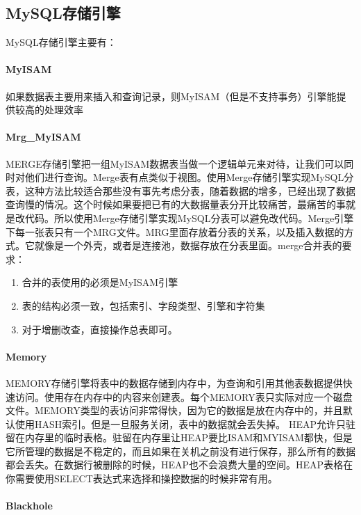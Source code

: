 \documentclass[../../../interview-questions.tex]{subfiles}
\begin{document}
\subsection{MySQL存储引擎}

MySQL存储引擎主要有： \paragraph{MyISAM} 

如果数据表主要用来插入和查询记录，则MyISAM（但是不支持事务）引擎能提供较高的处理效率

\paragraph{Mrg\_MyISAM} 

MERGE存储引擎把一组MyISAM数据表当做一个逻辑单元来对待，让我们可以同时对他们进行查询。Merge表有点类似于视图。使用Merge存储引擎实现MySQL分表，这种方法比较适合那些没有事先考虑分表，随着数据的增多，已经出现了数据查询慢的情况。这个时候如果要把已有的大数据量表分开比较痛苦，最痛苦的事就是改代码。所以使用Merge存储引擎实现MySQL分表可以避免改代码。Merge引擎下每一张表只有一个MRG文件。MRG里面存放着分表的关系，以及插入数据的方式。它就像是一个外壳，或者是连接池，数据存放在分表里面。merge合并表的要求：

\begin{enumerate}
\item{合并的表使用的必须是MyISAM引擎}
\item{表的结构必须一致，包括索引、字段类型、引擎和字符集}
\item{对于增删改查，直接操作总表即可。}
\end{enumerate}


\paragraph{Memory}

MEMORY存储引擎将表中的数据存储到内存中，为查询和引用其他表数据提供快速访问。使用存在内存中的内容来创建表。每个MEMORY表只实际对应一个磁盘文件。MEMORY类型的表访问非常得快，因为它的数据是放在内存中的，并且默认使用HASH索引。但是一旦服务关闭，表中的数据就会丢失掉。 HEAP允许只驻留在内存里的临时表格。驻留在内存里让HEAP要比ISAM和MYISAM都快，但是它所管理的数据是不稳定的，而且如果在关机之前没有进行保存，那么所有的数据都会丢失。在数据行被删除的时候，HEAP也不会浪费大量的空间。HEAP表格在你需要使用SELECT表达式来选择和操控数据的时候非常有用。


\paragraph{Blackhole}
\end{document}
